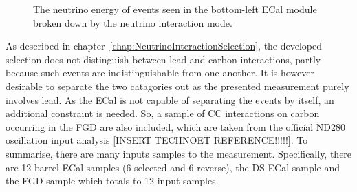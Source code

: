 \begin{figure}%
  \centering
  \caption{The neutrino energy of events seen in the bottom-left ECal module broken down by the neutrino interaction mode.}
  \label{fig:NuEnergyReactionCodeBottomLeft}
\end{figure}
\newline
\newline
As described in chapter~\ref{chap:NeutrinoInteractionSelection}, the developed selection does not distinguish between lead and carbon interactions, partly because such events are indistinguishable from one another.  It is however desirable to separate the two catagories out as the presented measurement purely involves lead.  As the ECal is not capable of separating the events by itself, an additional constraint is needed.  So, a sample of CC interactions on carbon occurring in the FGD are also included, which are taken from the official ND280 oscillation input analysis [INSERT TECHNOET REFERENCE!!!!!].
\newline
\newline
To summarise, there are many inputs samples to the measurement.  Specifically, there are 12 barrel ECal samples (6 selected and 6 reverse), the DS ECal sample and the FGD sample which totals to 12 input samples.

